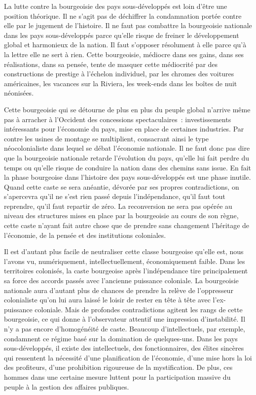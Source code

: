 \documentclass[french,twoside]{book} %
\begin{document}
\bigbreak
\noindent La lutte contre la bourgeoisie des pays sous-développés est loin d’être une position théorique. Il ne s’agit pas de déchiffrer la condamnation portée contre elle par le jugement de l’histoire. Il ne faut pas combattre la bourgeoisie nationale dans les pays   sous-développés parce qu’elle risque de freiner le développement global et harmonieux de la nation. Il faut s’opposer résolument à elle parce qu’à la lettre elle ne sert à rien. Cette bourgeoisie, médiocre dans ses gains, dans ses réalisations, dans sa pensée, tente de masquer cette médiocrité par des constructions de prestige à l’échelon individuel, par les chromes des voitures américaines, les vacances sur la Riviera, les week-ends dans les boîtes de nuit néonisées.\par
\bigbreak
\noindent Cette bourgeoisie qui se détourne de plus en plus du peuple global n’arrive même pas à arracher à l’Occident des concessions spectaculaires : investissements intéressants pour l’économie du pays, mise en place de certaines industries. Par contre les usines de montage se multiplient, consacrant ainsi le type néocolonialiste dans lequel se débat l’économie nationale. Il ne faut donc pas dire que la bourgeoisie nationale retarde l’évolution du pays, qu’elle lui fait perdre du temps ou qu’elle risque de conduire la nation dans des chemins sans issue. En fait la phase bourgeoise dans l’histoire des pays sous-développés est une phase inutile. Quand cette caste se sera anéantie, dévorée par ses propres contradictions, on s’apercevra qu’il ne s’est rien passé depuis l’indépendance, qu’il faut tout reprendre, qu’il faut repartir de zéro. La reconversion ne sera pas opérée au niveau des structures mises en place par la bourgeoisie au cours de son règne, cette caste n’ayant fait autre chose que de prendre sans changement l’héritage de l’économie, de la pensée et des institutions coloniales.\par
\bigbreak
\noindent Il est d’autant plus facile de neutraliser cette classe bourgeoise qu’elle est, nous l’avons vu, numériquement, intellectuellement, économiquement faible. Dans les territoires colonisés, la caste bourgeoise après l’indépendance tire principalement sa force des accords passés avec l’ancienne puissance coloniale. La bourgeoisie nationale aura d’autant plus de chances de prendre la relève de l’oppresseur colonialiste qu’on lui aura laissé le loisir de rester en tête à tête avec l’ex-puissance   coloniale. Mais de profondes contradictions agitent les rangs de cette bourgeoisie, ce qui donne à l’observateur attentif une impression d’instabilité. Il n’y a pas encore d’homogénéité de caste. Beaucoup d’intellectuels, par exemple, condamnent ce régime basé sur la domination de quelques-uns. Dans les pays sous-développés, il existe des intellectuels, des fonctionnaires, des élites sincères qui ressentent la nécessité d’une planification de l’économie, d’une mise hors la loi des profiteurs, d’une prohibition rigoureuse de la mystification. De plus, ces hommes dans une certaine mesure luttent pour la participation massive du peuple à la gestion des affaires publiques.\par
\end{document}
